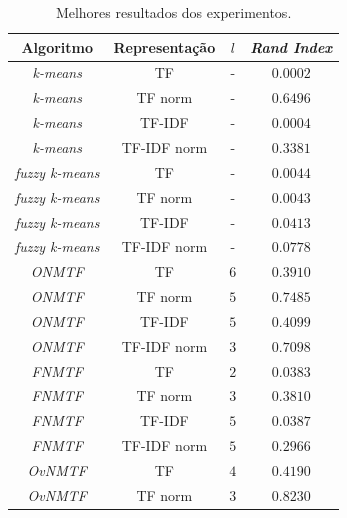 \documentclass[
    12pt,                %
    oneside,            %
    a4paper,            %
    english,            %
    brazil                %
    ]{abntex2ppgsi}
\begin{document}
\begin{table}[H]
\centering
    \caption{Melhores resultados dos experimentos.}
        \begin{tabular}{c|c|c|c}
            \hline
            Algoritmo              & Representação & $l$ & \textit{Rand Index} \\
            \hline
            \textit{k-means}       & TF            & -   & $0.0002$            \\
            \textit{k-means}       & TF norm       & -   & $0.6496$            \\
            \textit{k-means}       & TF-IDF        & -   & $0.0004$            \\
            \textit{k-means}       & TF-IDF norm   & -   & $0.3381$            \\
            \hline
            \textit{fuzzy k-means} & TF            & -   & $0.0044$            \\
            \textit{fuzzy k-means} & TF norm       & -   & $0.0043$            \\
            \textit{fuzzy k-means} & TF-IDF        & -   & $0.0413$            \\
            \textit{fuzzy k-means} & TF-IDF norm   & -   & $0.0778$            \\
            \hline
            \textit{ONMTF}         & TF            & $6$ & $0.3910$            \\
            \textit{ONMTF}         & TF norm       & $5$ & $0.7485$            \\
            \textit{ONMTF}         & TF-IDF        & $5$ & $0.4099$            \\
            \textit{ONMTF}         & TF-IDF norm   & $3$ & $0.7098$            \\
            \hline
            \textit{FNMTF}         & TF            & $2$ & $0.0383$            \\
            \textit{FNMTF}         & TF norm       & $3$ & $0.3810$            \\
            \textit{FNMTF}         & TF-IDF        & $5$ & $0.0387$            \\
            \textit{FNMTF}         & TF-IDF norm   & $5$ & $0.2966$            \\
            \hline
            \textit{OvNMTF}        & TF            & $4$ & $0.4190$            \\
            \textit{OvNMTF}        & TF norm       & $3$ & $0.8230$            \\

\end{tabular}
\end{table}
\end{document}
